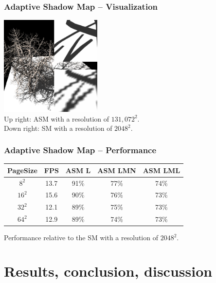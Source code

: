 \documentclass[xcolor={usenames,dvipsnames}]{beamer}
\begin{document}
\begin{frame}[t]
  \frametitle{Adaptive Shadow Map -- Visualization}
  \begin{center}
    \includegraphics[height=5cm]{img/asm} \\
    Up right: ASM with a resolution of $131,072^2$. \\
    Down right: SM with a resolution of $2048^2$.
  \end{center}
\end{frame}

\begin{frame}
  \frametitle{Adaptive Shadow Map -- Performance}
  \begin{center}
    \begin{tabular}{c c c c c}
      PageSize & FPS & ASM L & ASM LMN & ASM LML \\\hline
      $8^2$ & 13.7 & 91\% & 77\% & 74\% \\
      $16^2$ & 15.6 & 90\% & 76\% & 73\% \\
      $32^2$ & 12.1 & 89\% & 75\% & 73\% \\
      $64^2$ & 12.9 & 89\% & 74\% & 73\% \\
    \end{tabular} \vspace{9mm}

    Performance relative to the SM with a resolution of $2048^2$.
  \end{center}
\end{frame}

\section{Results, conclusion, discussion}
\end{document}
